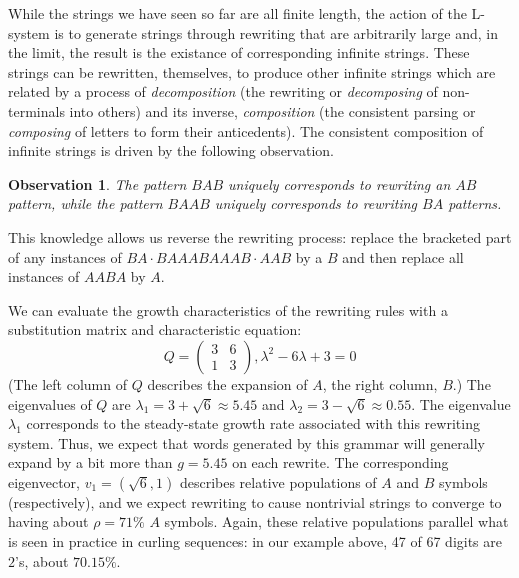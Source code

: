 \documentclass[11pt]{article}
\def\emph#1{{\em #1\/}}
\def\term#1{\emph{#1}}
\newcounter{thm}
\newtheorem{observation}[thm]{Observation}
\def\ni{\noindent}
\begin{document}
While the strings we have seen so far are all finite length, the action of the
L-system is to generate strings through rewriting that are arbitrarily large
and, in the limit, the result is the existance of corresponding infinite
strings.  These strings can be rewritten, themselves, to produce other
infinite strings which are related by a process of \term{decomposition} (the
rewriting or \term{decomposing} of non-terminals into others) and its inverse,
\term{composition} (the consistent parsing or \term{composing} of letters to
form their anticedents).  The consistent composition of infinite strings is driven by the following observation.
\begin{observation}
The pattern $BAB$ uniquely corresponds to rewriting an $AB$ pattern,
while the pattern $BAAB$ uniquely corresponds to rewriting $BA$ patterns.
\end{observation}
\ni This knowledge allows us reverse the rewriting process:
replace the bracketed part of any instances of $BA\cdot BAAABAAAB\cdot AAB$
by a $B$ and then replace all instances of $AABA$ by $A$.

We can evaluate the growth characteristics of the rewriting rules with a
substitution matrix and characteristic equation:
$$Q=\left( \begin{array}{cc} 3 & 6 \\ 1 & 3 \end{array} \right),
\lambda^2-6\lambda +3=0$$ \ni (The left column of $Q$ describes the expansion
of $A$, the right column, $B$.) The eigenvalues of $Q$ are
$\lambda_1=3+\sqrt{6}\approx 5.45$ and $\lambda_2=3-\sqrt{6}\approx 0.55$.
The eigenvalue $\lambda_1$ corresponds to the steady-state growth rate
associated with this rewriting system.  Thus, we expect that words generated
by this grammar will generally expand by a bit more than $g=5.45$ on each
rewrite.  The corresponding eigenvector, $v_1=(\sqrt{6},1)$ describes relative
populations of $A$ and $B$ symbols (respectively), and we expect rewriting to
cause nontrivial strings to converge to having about $\rho=71\%$ $A$ symbols.
Again, these relative populations parallel what is seen in practice in curling
sequences: in our example above, 47 of 67 digits are $2$'s, about $70.15\%$.
\end{document}
